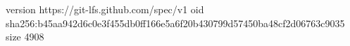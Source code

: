 version https://git-lfs.github.com/spec/v1
oid sha256:b45aa942d6c0e3f455db0ff166e5a6f20b430799d57450ba48cf2d06763c9035
size 4908
